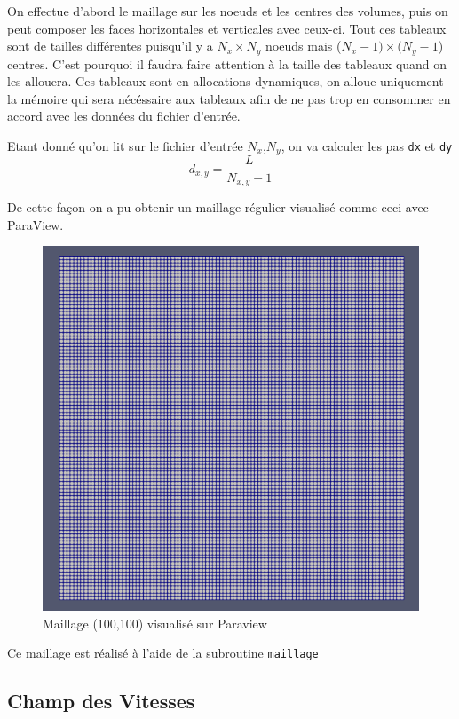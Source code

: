 \documentclass[a4paper,oneside]{article}
\makeatletter
\def\bigcenter{\trivlist \bigcentering\item\relax}
\def\bigcentering{\let\\\@centercr\rightskip\@bigflushglue%
\leftskip\@bigflushglue
\parindent\z@\parfillskip\z@skip}
\makeatother
\begin{document}
On effectue d'abord le maillage sur les noeuds et les centres des volumes, puis on peut composer les faces horizontales et verticales avec ceux-ci.
Tout ces tableaux sont de tailles différentes puisqu'il y a $N_x \times N_y$ noeuds mais ($N_x -1 )\times (N_y -1$) centres.
C'est pourquoi il faudra faire attention à la taille des tableaux quand on les allouera.
Ces tableaux sont en allocations dynamiques, on alloue uniquement la mémoire qui sera nécéssaire aux tableaux afin de ne pas trop en consommer en accord avec les données du fichier d'entrée. 


Etant donné qu'on lit sur le fichier d'entrée $N_x$,$N_y$, on va calculer les pas \verb?dx? et \verb?dy? 
\[
 d_{x,y} = \frac{L}{N_{x,y} -1}
\]

De cette façon on a pu obtenir un maillage régulier visualisé comme ceci avec ParaView.

\begin{figure}[h!]
\bigcenter
\includegraphics[scale=0.4]{Champ_Vitesse_Maillage/maillage100100.PNG}
\caption{Maillage (100,100) visualisé sur Paraview}
\end{figure}

Ce maillage est réalisé à l'aide de la subroutine \verb?maillage?

\subsection{Champ des Vitesses}
\end{document}
